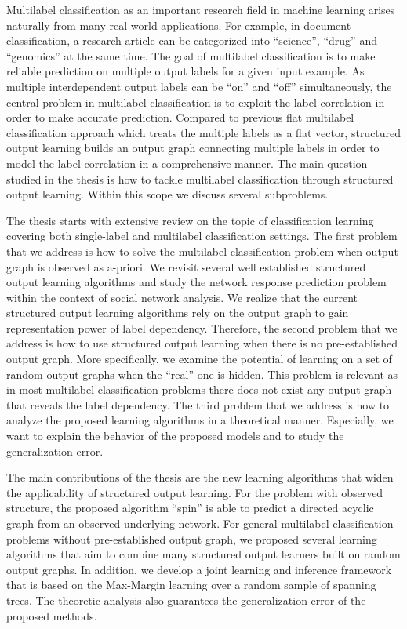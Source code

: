 \documentclass[10pt]{article}
\begin{document}
\setlength{\parindent}{3mm}
\small

\noindent Multilabel classification as an important research field in machine learning arises naturally from many real world applications. For example, in document classification, a research article can be categorized into ``science'', ``drug'' and ``genomics'' at the same time. The goal of multilabel classification is to make reliable prediction on multiple output labels for a given input example. As multiple interdependent output labels can be ``on'' and ``off'' simultaneously, the central problem in multilabel classification is to exploit the label correlation in order to make accurate prediction. Compared to previous flat multilabel classification approach which treats the multiple labels as a flat vector, structured output learning builds an output graph connecting multiple labels in order to model the label correlation in a comprehensive manner. The main question studied in the thesis is how to tackle multilabel classification through structured output learning. Within this scope we discuss several subproblems.

The thesis starts with extensive review on the topic of classification learning covering both single-label and multilabel classification settings. The first problem that we address is how to solve the multilabel classification problem when output graph is observed as a-priori. We revisit several well established structured output learning algorithms and study the network response prediction problem within the context of social network analysis. We realize that the current structured output learning algorithms rely on the output graph to gain representation power of label dependency. Therefore, the second problem that we address is how to use structured output learning when there is no pre-established output graph. More specifically, we examine the potential of learning on a set of random output graphs when the ``real'' one is hidden. This problem is relevant as in most multilabel classification problems there does not exist any output graph that reveals the label dependency. The third problem that we address is how to analyze the proposed learning algorithms in a theoretical manner. Especially, we want to explain the behavior of the proposed models and to study the generalization error.

The main contributions of the thesis are the new learning algorithms that widen the applicability of structured output learning. For the problem with observed structure, the proposed algorithm ``{\sc spin}'' is able to predict a directed acyclic graph from an observed underlying network. For general multilabel classification problems without pre-established output graph, we proposed several learning algorithms that aim to combine many structured output learners built on random output graphs. In addition, we develop a joint learning and inference framework that is based on the Max-Margin learning over a random sample of spanning trees. The theoretic analysis also guarantees the generalization error of the proposed methods.
\end{document}
